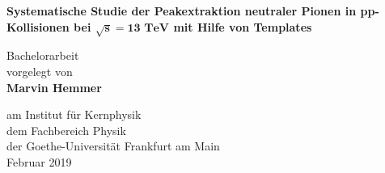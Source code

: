 \vspace*{1cm}

\huge
\textbf{Systematische Studie der Peakextraktion neutraler Pionen in pp-Kollisionen bei $\boldsymbol{\sqrt{s}=13\text{ TeV}}$ mit Hilfe von Templates}

 
\vspace{3.5cm}
\LARGE
Bachelorarbeit\\
vorgelegt von\\
\textbf{Marvin Hemmer}

\vfill
 
\Large
am Institut für Kernphysik\\
dem Fachbereich Physik\\
der Goethe-Universität Frankfurt am Main\\
Februar 2019
 
